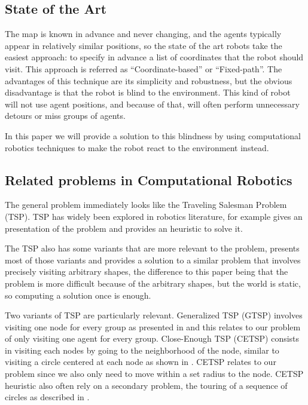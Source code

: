 \documentclass[]{article}
\begin{document}
\subsection{State of the Art}
The map is known in advance and never changing, and the agents typically appear in relatively similar positions, so the state of the art robots take the easiest approach: to specify in advance a list of coordinates that the robot should visit. This approach is referred as ``Coordinate-based'' or ``Fixed-path''. The advantages of this technique are its simplicity and robustness, but the obvious disadvantage is that the robot is blind to the environment. This kind of robot will not use agent positions, and because of that, will often perform unnecessary detours or miss groups of agents.

In this paper we will provide a solution to this blindness by using computational robotics techniques to make the robot react to the environment instead.

\subsection{Related problems in Computational Robotics}
The general problem immediately looks like the Traveling Salesman Problem (TSP). TSP has widely been explored in robotics literature, for example \cite{dorigo1997ant} gives an presentation of the problem and provides an heuristic to solve it.

The TSP also has some variants that are more relevant to the problem, \cite{alatartsev2013optimizing} presents most of those variants and provides a solution to a similar problem that involves precisely visiting arbitrary shapes, the difference to this paper being that the problem is more difficult because of the arbitrary shapes, but the world is static, so computing a solution once is enough.

Two variants of TSP are particularly relevant. Generalized TSP (GTSP) involves visiting one node for every group as presented in \cite{laporte1996some} and this relates to our problem of only visiting one agent for every group. Close-Enough TSP (CETSP) consists in visiting each nodes by going to the neighborhood of the node, similar to visiting a circle centered at each node as shown in \cite{mennell2009heuristics}. CETSP relates to our problem since we also only need to move within a set radius to the node. CETSP heuristic also often rely on a secondary problem, the touring of a sequence of circles as described in \cite{chou2012shortest}.
\end{document}
